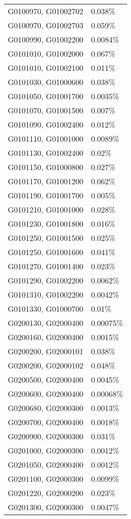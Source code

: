 \begin{longtable}[]{@{}ll@{}}
G0100970, G01002702 & 0.038\% \\
G0100970, G01002703 & 0.059\% \\
G0100990, G01002200 & 0.0084\% \\
G0101010, G01002000 & 0.067\% \\
G0101010, G01002100 & 0.011\% \\
G0101030, G01000600 & 0.038\% \\
G0101050, G01001700 & 0.0035\% \\
G0101070, G01001500 & 0.007\% \\
G0101090, G01002400 & 0.012\% \\
G0101110, G01001000 & 0.0089\% \\
G0101130, G01002400 & 0.02\% \\
G0101150, G01000800 & 0.027\% \\
G0101170, G01001200 & 0.062\% \\
G0101190, G01001700 & 0.005\% \\
G0101210, G01001000 & 0.028\% \\
G0101230, G01001800 & 0.016\% \\
G0101250, G01001500 & 0.025\% \\
G0101250, G01001600 & 0.041\% \\
G0101270, G01001400 & 0.023\% \\
G0101290, G01002200 & 0.0062\% \\
G0101310, G01002200 & 0.0042\% \\
G0101330, G01000700 & 0.01\% \\
G0200130, G02000400 & 0.00075\% \\
G0200160, G02000400 & 0.0015\% \\
G0200200, G02000101 & 0.038\% \\
G0200200, G02000102 & 0.048\% \\
G0200500, G02000400 & 0.0045\% \\
G0200600, G02000400 & 0.00068\% \\
G0200680, G02000300 & 0.0013\% \\
G0200700, G02000400 & 0.0018\% \\
G0200900, G02000300 & 0.031\% \\
G0201000, G02000300 & 0.0012\% \\
G0201050, G02000400 & 0.0012\% \\
G0201100, G02000300 & 0.0099\% \\
G0201220, G02000200 & 0.023\% \\
G0201300, G02000300 & 0.0047\% \\

\end{longtable}
